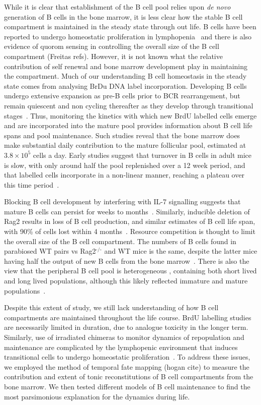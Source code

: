 \documentclass[11pt,onecolumn]{article}
\newcommand{\superscript}[1]{\ensuremath{^{\textrm{#1}}}} %
\newcommand{\red}[1]{{\color{red}{#1}}}
\newcommand{\scinot}[2]{\ensuremath{#1 \times 10^{#2}}}
\begin{document}
While it is clear that establishment of the B cell pool relies upon \textit{de novo} generation of B cells in the bone marrow, it is less clear how the stable B cell compartment is maintained in the steady state through out life. B cells have been reported to undergo homeostatic proliferation in lymphopenia~\citep{MeyerBahlburg:2008bc, Cabatingan:2002fm} and there is also evidence of quorom sensing in controlling the overall size of the B cell compartment (Freitas refs). However, it is not known what the relative contribution of self renewal and bone marrow development play in maintaining the compartment. Much of our understanding B cell homeostasis in the steady state comes from analysing BrDu DNA label incorporation. Developing B cells undergo extensive expansion as pre-B cells prior to BCR rearrangement, but remain quiescent and non cycling thereafter  as they develop through transitional stages~\citep{Srivastava:2005jja}. Thus, monitoring the kinetics with which new BrdU labelled cells emerge and are incorporated into the mature pool provides information about B cell life spans and pool maintenance. Such studies reveal that the bone marrow does make substantial daily contribution to the mature follicular pool, estimated at \scinot{3.8}{5} cells a day. Early studies suggest that turnover in B cells in adult mice is slow, with only around half the pool replenished over a 12 week period, and that labelled cells incorporate in a non-linear manner, reaching a plateau over this time period~\citep{Forster:1990tl, Fulcher:1997dr}. 

Blocking B cell development by interfering with IL-7 signalling suggests that mature B cells can persist for weeks to months~\citep{Grabstein:1993jb}. Similarly, inducible deletion of Rag2 results in loss of B cell production, and similar estimates of B cell life span, with 90\% of cells lost within 4 months~\citep{comp:2001ti}. Resource competition is thought to limit the overall size of the B cell compartment. The numbers of B cells found in parabiosed WT pairs vs Rag2\superscript{-/-} and WT mice is the same, despite the latter mice having half the output of new B cells from the bone marrow~\citep{Agenes:1997hk}. There is also the view that the peripheral B cell pool is heterogeneous \red{isn't this unsurprising since there are multiple subsets?}, containing both short lived and long lived populations, although this likely reflected immature and mature populations~\citep{Fulcher:1997dr}.

Despite this extent of study, we still lack understanding of how B cell compartments are maintained throughout the life course. BrdU labelling studies are necessarily limited in duration, due to analogue toxicity in the longer term. Similarly, use of irradiated chimeras to monitor dynamics of repopulation and maintenance are complicated by the lymphopenic environment that induces transitional cells to undergo homeostatic proliferation~\citep{MeyerBahlburg:2008bc}. To address these issues, we employed the method of temporal fate mapping (hogan cite) to measure the contribution and extent of tonic reconstitutions of B cell compartments from the bone marrow. We then tested different models of B cell maintenance to find the most parsimonious explanation for the dynamics during life. 
\end{document}
